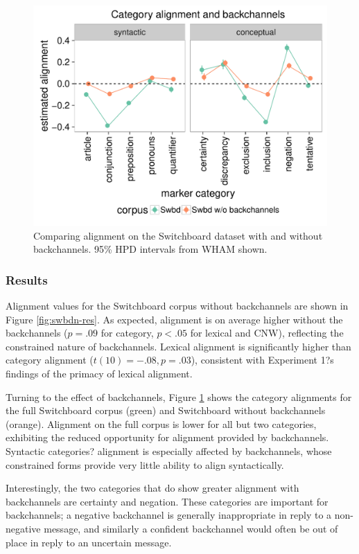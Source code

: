 \documentclass[11pt]{article}
\begin{document}
\begin{figure}[t]
  \begin{center}
    \includegraphics[width=\columnwidth]{results/swbds_line.pdf}
  \end{center}
  \caption{Comparing alignment on the Switchboard dataset with and without backchannels. 95\% HPD intervals from WHAM shown.}\label{fig:swbds-res}
\end{figure}

\subsubsection{Results}
Alignment values for the Switchboard corpus without backchannels are shown in Figure \ref{fig:swbdn-res}. As expected, alignment is on average higher without the backchannels ($p=.09$ for category, $p<.05$ for lexical and CNW), reflecting the constrained nature of backchannels. Lexical alignment is significantly higher than category alignment ($t(10) =-.08, p = .03$), consistent with Experiment 1?s findings of the primacy of lexical alignment.

Turning to the effect of backchannels, Figure \ref{fig:swbds-res} shows the category alignments for the full Switchboard corpus (green) and Switchboard without backchannels (orange). Alignment on the full corpus is lower for all but two categories, exhibiting the reduced opportunity for alignment provided by backchannels. Syntactic categories? alignment is especially affected by backchannels, whose constrained forms provide very little ability to align syntactically. 

Interestingly, the two categories that do show greater alignment with backchannels are certainty and negation. These categories are important for backchannels; a negative backchannel is generally inappropriate in reply to a non-negative message, and similarly a confident backchannel would often be out of place in reply to an uncertain message.
\end{document}

